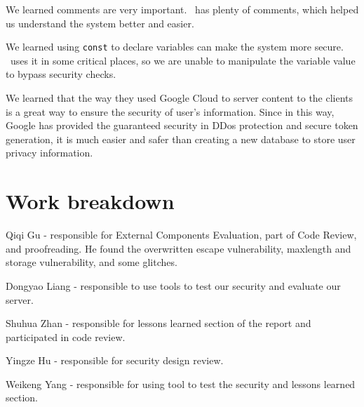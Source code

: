 \documentclass[12pt, a4paper]{article}
\newcommand{\code}[1]{\texttt{#1}}
\begin{document}
We learned comments are very important. \theproject\ has plenty of comments, which helped us understand the system better and easier. 

We learned using \code{const} to declare variables can make the system more secure. \theproject\ uses it in some critical places, so we are unable to manipulate the variable value to bypass security checks.

We learned that the way they used Google Cloud to server content to the clients is a great way to ensure the security of user's information. Since in this way, Google has provided the guaranteed security in DDos protection and secure token generation, it is much easier and safer than creating a new database to store user privacy information. 

\section{Work breakdown}
Qiqi Gu - responsible for External Components Evaluation, part of Code Review, and proofreading. He found the overwritten escape vulnerability, maxlength and storage vulnerability, and some glitches.

Dongyao Liang - responsible to use tools to test our security and evaluate our server.

Shuhua Zhan - responsible for lessons learned section of the report and participated in code review. 

Yingze Hu - responsible for security design review.

Weikeng Yang - responsible for using tool to test the security and lessons learned section. 





\newcommand{\citeWeb}[4][date=]{\pgfkeys{/citeWeb, #1}%
#2, \url{#3}, %
\ifx\citeWebdate\empty\else\citeWebdate, \fi%
Retrieved #4.}
\end{document}
